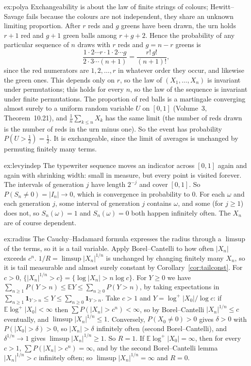 \begin{solution}{ex:polya}
\idea Exchangeability is about the law of finite strings of colours; Hewitt--Savage fails because the colours are not independent, they
share an unknown limiting proportion.
\writeup After $r$ reds and $g$ greens have been drawn, the urn holds $r+1$ red and $g+1$ green balls among $r+g+2$. Hence the probability of any
particular sequence of $n$ draws with $r$ reds and $g=n-r$ greens is
\[
\frac{1\cdot2\cdots r\cdot1\cdot2\cdots g}{2\cdot3\cdots(n+1)}=\frac{r!\,g!}{(n+1)!},
\]
since the red numerators are $1,2,\dots,r$ in whatever order they occur, and likewise the green ones. This depends only on $r$, so the law
of $(X_1,\dots,X_n)$ is invariant under permutations; this holds for every $n$, so the law of the sequence is invariant under finite
permutations. The proportion of red balls is a martingale converging almost surely to a uniform random variable $U$ on $[0,1]$ (Volume~3,
Theorem~10.21), and $\frac1n\sum_{k\le n}X_k$ has the same limit (the number of reds drawn is the number of reds in the urn minus one). So
the event has probability $P(U>\frac12)=\frac12$. It is exchangeable, since the limit of averages is unchanged by permuting finitely many
terms.
\end{solution}

\begin{solution}{ex:levyindep}
\idea The typewriter sequence moves an indicator across $[0,1]$ again and again with shrinking width: small in measure, but every point is
visited forever.
\writeup The intervals of generation $j$ have length $2^{-j}$ and cover $[0,1]$. So $P(S_n\ne0)=|I_n|\to0$, which is convergence in
probability to $0$. For each $\omega$ and each generation $j$, some interval of generation $j$ contains $\omega$, and some (for $j\ge1$)
does not, so $S_n(\omega)=1$ and $S_n(\omega)=0$ both happen infinitely often. The $X_n$ are of course dependent.
\end{solution}

\begin{solution}{ex:radius}
\idea The Cauchy--Hadamard formula expresses the radius through a $\limsup$ of the terms, so it is a tail variable. Apply Borel--Cantelli to how often
$|X_n|$ exceeds $c^n$.
\writeup $1/R=\limsup|X_n|^{1/n}$ is unchanged by changing finitely many $X_n$, so it is tail measurable and almost surely constant by
Corollary~\ref{cor:tailconst}. For $c>0$, $\{|X_n|^{1/n}>c\}=\{\log|X_n|>n\log c\}$. For $Y\ge0$ we have $\sum_{n\ge1}P(Y>n)\le\mathbb E Y\le
\sum_{n\ge0}P(Y>n)$, by taking expectations in $\sum_{n\ge1}\mathbf 1_{Y>n}\le Y\le\sum_{n\ge0}\mathbf 1_{Y>n}$. Take $c>1$ and $Y=\log^+|X_0|/\log c$: if $\mathbb E\log^+|X_0|<\infty$ then $\sum P(|X_n|>c^n)<\infty$, so by
Borel--Cantelli $|X_n|^{1/n}\le c$ eventually, and $\limsup|X_n|^{1/n}\le1$. Conversely, $P(X_0\ne0)>0$ gives $\delta>0$ with $P(|X_0|>\delta)>0$,
so $|X_n|>\delta$ infinitely often (second Borel--Cantelli), and $\delta^{1/n}\to1$ gives $\limsup|X_n|^{1/n}\ge1$. So $R=1$. If
$\mathbb E\log^+|X_0|=\infty$, then for every $c>1$, $\sum P(|X_n|>c^n)=\infty$, and by the second Borel--Cantelli lemma $|X_n|^{1/n}>c$
infinitely often; so $\limsup|X_n|^{1/n}=\infty$ and $R=0$.
\end{solution}

